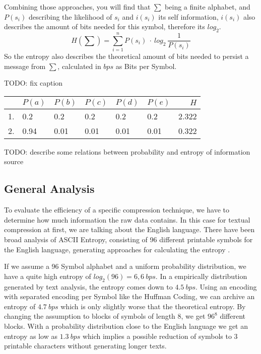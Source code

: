 \par{
Combining those approaches, you will find that $\sum$ being a finite alphabet, and $P(s_i)$ describing the likelihood of $s_i$ and $i(s_i)$ its self information, $i(s_i)$ also describes the amount of bits needed for this symbol, therefore its $log_2$.
\[
	H(\sum) = \sum_{i = 1}^{n} P(s_i) \: \cdot \: log_{2} \: \frac{1}{P(s_i) }
\]
So the entropy 	also describes the theoretical amount of bits needed to persist a message from $\sum$, calculated in $bps$ as Bits per Symbol.

TODO: fix caption

\begin{center}
\begin{tabular}[p]{l|l|l|l|l|l|r}
	
	& $P(a)$ & $P(b)$ & $P(c)$ & $P(d)$ & $P(e)$ & $H$ \\
	\hline
	1. & 0.2 & 0.2 & 0.2 & 0.2 & 0.2 & 2.322 \\
	2. & 0.94 & 0.01 & 0.01 & 0.01 & 0.01 & 0.322
	\label{tab:heisetabelle}
\end{tabular}
\end{center}
TODO: describe some relations between probability and entropy of information source
}
\subsection{General Analysis}
\par{
To evaluate the efficiency of a specific compression technique, we have to determine how much information the raw data contains. In this case for textual compression at first, we are talking about the English language. There have been broad analysis of ASCII Entropy, consisting of 96 different printable symbols for the English language, generating approaches for calculating the entropy \cite{entropy-fernau}.
}

\par {
If we assume a 96 Symbol alphabet and a uniform probability distribution, we have a quite high entropy of $log_2 (96) = 6,6 \: bps$. In a empirically distribution generated by text analysis, the entropy comes down to $4.5 \: bps$. Using an encoding with separated encoding per Symbol like the Huffman Coding, we can archive an entropy of $4.7 \: bps$ which is only slightly worse that the theoretical entropy. By changing the assumption to blocks of symbols of length 8, we get $96^8$ different blocks. With a probability distribution close to the English language we get an entropy as low as $1.3 \: bps$ which implies a possible reduction of symbols to 3 printable characters without generating longer texts.}

